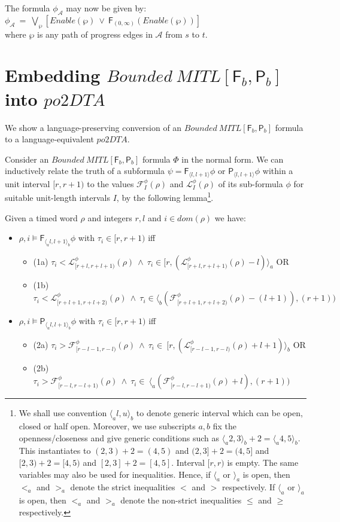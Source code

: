 \documentclass{llncs}
\newcommand{\fut}{\textsf{F}}
\newcommand{\past}{\textsf{P}}
\newcommand{\bmitlfp}{\mbox{$\mathit{Bounded ~MITL[\fut_b,\past_b]}$}}
\newcommand{\potdta}{\mbox{$\mathit{po2DTA}$}}
\newcommand{\autm}{\mathcal A}
\newcommand{\mitlfpb}{\bmitlfp}
\newcommand{\frst}{{\mathcal F}}
\newcommand{\lst}{{\mathcal L}}
\begin{document}
The formula $\phi_\autm$ may now be given by:\\
$\phi_\autm ~ =~ \bigvee\limits_{\wp}[\mathit{Enable}(\wp) ~ \lor~ \fut_{(0,\infty)}(\mathit{Enable}(\wp))]$\\
where $\wp$ is any path of progress edges in $\autm$ from $s$ to $t$.\\


\section{Embedding \mitlfpb\/ into \potdta}
We show a language-preserving conversion of an \mitlfpb\/ formula to a language-equivalent \potdta. 


Consider an \mitlfpb\/ formula $\Phi$ in the normal form.
We can inductively relate the truth of a subformula $\psi= \fut_{\langle l,l+1\rangle} \phi$ or
$\past_{\langle l,l+1\rangle} \phi$ within a unit interval $[r,r+1)$ to the values $\frst^\phi_I(\rho)$ 
and $\lst^\phi_I(\rho)$ of its sub-formula $\phi$ for suitable unit-length intervals 
$I$, by the following lemma\footnote{ We
shall use convention $\langle_a l,u \rangle_b$ to denote generic interval which can be open, closed or half open. Moreover, we use subscripts $a,b$ fix the openness/closeness and give generic conditions such as $\langle_a 2,3 \rangle_b + 2 = \langle_a 4,5 \rangle_b$. This instantiates to $(2,3) + 2 = (4,5)$ and $(2,3] + 2 = (4,5]$ and $[2,3) + 2 = [4,5)$ and $[2,3] + 2 = [4,5]$. Interval $[r,r)$ is empty. The same variables may also be used for inequalities. Hence, if $\langle_a$ or $\rangle_a$ is open, then $<_a$ and $>_a$ denote the strict inequalities $<$ and $>$ respectively. If $\langle_a$ or $\rangle_a$ is open, then $<_a$ and $>_a$ denote the non-strict inequalities $\leq$ and $\geq$ respectively.}. 
\begin{lemma} 
\label{lem:embedtwo}
Given a timed word $\rho$ and integers $r,l$ and $i \in dom(\rho)$ we have:
\begin{itemize}
\item $\rho,i\models \fut_{ \langle_a l, l+1 \rangle_b} \phi$ with $\tau_i \in [r,r+1)$ iff
\begin{itemize}
\item (1a) $\tau_i<\lst^\phi_{[r+l,r+l+1)}(\rho) ~\land ~ \tau_i \in [ r, (\lst^\phi_{[r+l,r+l+1)}(\rho)-l) \rangle_a$ OR 
\item (1b) $\tau_i<\lst^\phi_{[r+l+1,r+l+2)}(\rho) ~\land ~ \tau_i \in \langle_b(\frst^\phi_{[r+l+1,r+l+2)}(\rho)-(l+1)),(r+1))$ \\
\end{itemize}
\item $\rho,i\models \past_{ \langle_a l, l+1 \rangle_b} \phi$ with $\tau_i \in [r,r+1)$ iff
\begin{itemize} 
\item (2a) $\tau_i>\frst^\phi_{[r-l-1,r-l)}(\rho) ~\land ~ \tau_i \in ~ [ r,(\lst^\phi_{[r-l-1,r-l)}(\rho)+l+1) \rangle_b$ OR
\item (2b) $\tau_i>\frst^\phi_{[r-l,r-l+1)}(\rho) ~\land~ \tau_i\in ~ \langle_a (\mathcal F^\phi_{[r-l,r-l+1)}(\rho)+l),(r+1) )$ 
\end{itemize}
\end{itemize}
\end{lemma}
\end{document}
